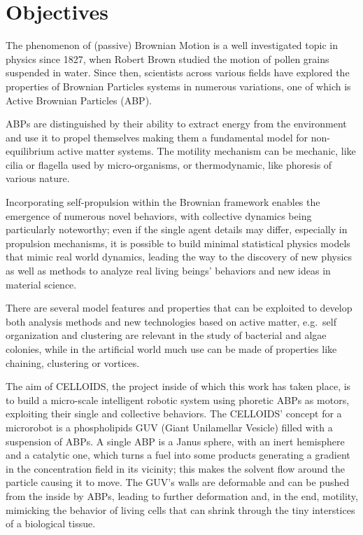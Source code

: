 \documentclass[../master_thesis_np.tex]{subfiles}
\begin{document}
	\section{Objectives}
	
	The phenomenon of (passive) Brownian Motion is a well investigated topic in physics since 1827, when Robert Brown studied the motion of pollen grains suspended in water.
	Since then, scientists across various fields have explored the properties of Brownian Particles systems in numerous variations, one of which is Active Brownian Particles (ABP). 
	
	ABPs are distinguished by their ability to extract energy from the environment and use it to propel themselves making them a fundamental model for non-equilibrium active matter systems.	
	The motility mechanism can be mechanic, like cilia or flagella used by micro-organisms, or thermodynamic, like phoresis of various nature. 
	
	Incorporating self-propulsion within the Brownian framework enables the emergence of numerous novel behaviors, with collective dynamics being particularly noteworthy; even if the single agent details may differ, especially in propulsion mechanisms, it is possible to build minimal statistical physics models that mimic real world dynamics, leading the way to the discovery of new physics as well as methods to analyze real living beings' behaviors and new ideas in material science. 
	
	There are several model features and properties that can be exploited to develop both analysis methods and new technologies based on active matter, e.g.\ self organization and clustering are relevant in the study of bacterial and algae colonies, while in the artificial world much use can be made of properties like chaining, clustering or vortices.
	
	The aim of CELLOIDS, the project inside of which this work has taken place, is to build a micro-scale intelligent robotic system using phoretic ABPs as motors, exploiting their single and collective behaviors. The CELLOIDS’ concept for a microrobot is a phospholipids GUV (Giant Unilamellar Vesicle) filled with a suspension of ABPs. A single ABP is a Janus sphere, with an inert hemisphere and a catalytic one, which turns a fuel into some products generating a gradient in the concentration field in its vicinity; this makes the solvent flow around the particle causing it to move. The GUV’s walls are deformable and can be pushed from the inside by ABPs, leading to further deformation and, in the end, motility, mimicking the behavior of living cells that can shrink through the tiny interstices of a biological tissue. 
	
\end{document}
